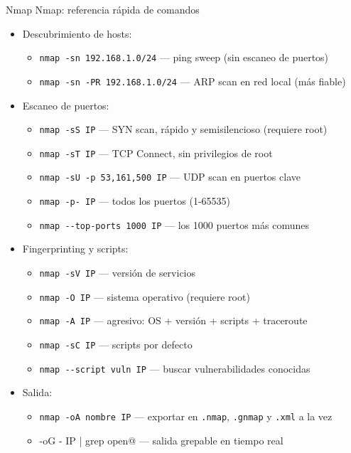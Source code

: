 \documentclass[aspectratio=169,11pt]{beamer}
\begin{document}
\begin{frame}{Nmap}
\small
Nmap: referencia rápida de comandos
  \begin{itemize}
  \item Descubrimiento de hosts:
    \begin{itemize}
    \item \verb|nmap -sn 192.168.1.0/24| --- ping sweep (sin escaneo de puertos)
    \item \verb|nmap -sn -PR 192.168.1.0/24| --- ARP scan en red local (más fiable)
    \end{itemize}
  \item Escaneo de puertos:
    \begin{itemize}
    \item \verb|nmap -sS IP| --- SYN scan, rápido y semisilencioso (requiere root)
    \item \verb|nmap -sT IP| --- TCP Connect, sin privilegios de root
    \item \verb|nmap -sU -p 53,161,500 IP| --- UDP scan en puertos clave
    \item \verb|nmap -p- IP| --- todos los puertos (1-65535)
    \item \verb|nmap --top-ports 1000 IP| --- los 1000 puertos más comunes
    \end{itemize}
  \item Fingerprinting y scripts:
    \begin{itemize}
    \item \verb|nmap -sV IP| --- versión de servicios
    \item \verb|nmap -O IP| --- sistema operativo (requiere root)
    \item \verb|nmap -A IP| --- agresivo: OS + versión + scripts + traceroute
    \item \verb|nmap -sC IP| --- scripts por defecto
    \item \verb|nmap --script vuln IP| --- buscar vulnerabilidades conocidas
    \end{itemize}
  \item Salida:
    \begin{itemize}
    \item \verb|nmap -oA nombre IP| --- exportar en \verb|.nmap|, \verb|.gnmap| y \verb|.xml| a la vez
    \item \verb@nmap -oG - IP | grep open@ --- salida grepable en tiempo real
    \end{itemize}
  \end{itemize}
\end{frame}
\end{document}
